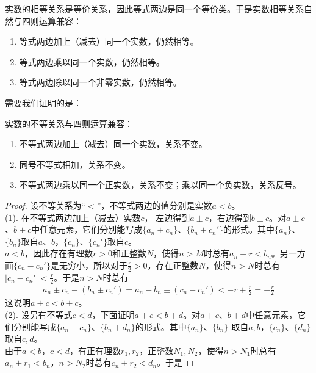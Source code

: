 \documentclass[12pt,UTF8]{ctexbook}
\begin{document}
\begin{appendix}
实数的相等关系是等价关系，因此等式两边是同一个等价类。于是实数相等关系自然与四则运算兼容：
\begin{tm}\label{tm:a-1-25}
    \begin{enumerate}
        \item 等式两边加上（减去）同一个实数，仍然相等。
        \item 等式两边乘以同一个实数，仍然相等。
        \item 等式两边除以同一个非零实数，仍然相等。
    \end{enumerate}
\end{tm}
需要我们证明的是：
\begin{tm}\label{tm:a-1-30}
    实数的不等关系与四则运算兼容：
    \begin{enumerate}
        \item 不等式两边加上（减去）同一个实数，关系不变。
        \item 同号不等式相加，关系不变。
        \item 不等式两边乘以同一个正实数，关系不变；乘以同一个负实数，关系反号。
    \end{enumerate}
\end{tm}
\begin{proof}
    设不等关系为“$<$”，不等式两边的值分别是实数$a<b$。\\
    (1). 在不等式两边加上（减去）实数$c$，
    左边得到$a\pm c$，右边得到$b\pm c$。对$a\pm c$、$b\pm c$中任意元素，它们分别能写成$\{a_n\pm c_n\}$、$\{b_n\pm c_n'\}$的形式。其中$\{a_n\}$、$\{b_n\}$取自$a$、$b$，$\{c_n\}$、$\{c_n'\}$取自$c$。\\%
    $a<b$，因此存在有理数$r>0$和正整数$N$，使得$n>M$时总有$a_n+r<b_n$。另一方面$\{c_n - c_n'\}$是无穷小，所以对于$\frac{r}{2}>0$，存在正整数$N$，使得$n>N$时总有$|c_n - c_n'| < \frac{r}{2}$。于是$n>N$时总有
    \begin{align*}
        a_n\pm c_n-(b_n\pm c_n') = a_n - b_n \pm  (c_n - c_n') < -r + \frac{r}{2} = -\frac{r}{2}
    \end{align*}
    这说明$a\pm c < b\pm c$。\\
    (2). 设另有不等式$c<d$，下面证明$a + c < b + d$。对$a + c$、$b + d$中任意元素，它们分别能写成$\{a_n + c_n\}$、$\{b_n + d_n\}$的形式。其中$\{a_n\}$、$\{b_n\}$
    取自$a,b$，$\{c_n\}$、$\{d_n\}$取自$c,d$。\\%
    由于$a < b$，$c < d$，有正有理数$r_1,r_2$，正整数$N_1,N_2$，使得$n>N_1$时总有$a_n + r_1 < b_n$，$n>N_2$时总有$c_n +r_2 < d_n$。于是

\end{proof}
\end{appendix}
\end{document}
